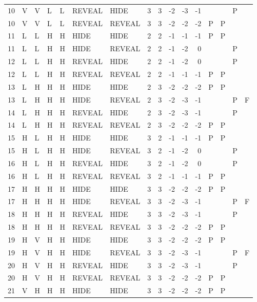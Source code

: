 \begin{longtable}{rllllllrrrrrllll}
  10 & V & V & L & L & REVEAL & HIDE & 3 & 3 & -2 & -3 & -1 &  &  & P &  \\ 
  10 & V & V & L & L & REVEAL & REVEAL & 3 & 3 & -2 & -2 & -2 & P & P &  &  \\ 
  11 & L & L & H & H & HIDE & HIDE & 2 & 2 & -1 & -1 & -1 & P & P &  &  \\ 
  11 & L & L & H & H & HIDE & REVEAL & 2 & 2 & -1 & -2 & 0 &  &  & P &  \\ 
  12 & L & L & H & H & REVEAL & HIDE & 2 & 2 & -1 & -2 & 0 &  &  & P &  \\ 
  12 & L & L & H & H & REVEAL & REVEAL & 2 & 2 & -1 & -1 & -1 & P & P &  &  \\ 
  13 & L & H & H & H & HIDE & HIDE & 2 & 3 & -2 & -2 & -2 & P & P &  &  \\ 
  13 & L & H & H & H & HIDE & REVEAL & 2 & 3 & -2 & -3 & -1 &  &  & P & F \\ 
  14 & L & H & H & H & REVEAL & HIDE & 2 & 3 & -2 & -3 & -1 &  &  & P &  \\ 
  14 & L & H & H & H & REVEAL & REVEAL & 2 & 3 & -2 & -2 & -2 & P & P &  &  \\ 
  15 & H & L & H & H & HIDE & HIDE & 3 & 2 & -1 & -1 & -1 & P & P &  &  \\ 
  15 & H & L & H & H & HIDE & REVEAL & 3 & 2 & -1 & -2 & 0 &  &  & P &  \\ 
  16 & H & L & H & H & REVEAL & HIDE & 3 & 2 & -1 & -2 & 0 &  &  & P &  \\ 
  16 & H & L & H & H & REVEAL & REVEAL & 3 & 2 & -1 & -1 & -1 & P & P &  &  \\ 
  17 & H & H & H & H & HIDE & HIDE & 3 & 3 & -2 & -2 & -2 & P & P &  &  \\ 
  17 & H & H & H & H & HIDE & REVEAL & 3 & 3 & -2 & -3 & -1 &  &  & P & F \\ 
  18 & H & H & H & H & REVEAL & HIDE & 3 & 3 & -2 & -3 & -1 &  &  & P &  \\ 
  18 & H & H & H & H & REVEAL & REVEAL & 3 & 3 & -2 & -2 & -2 & P & P &  &  \\ 
  19 & H & V & H & H & HIDE & HIDE & 3 & 3 & -2 & -2 & -2 & P & P &  &  \\ 
  19 & H & V & H & H & HIDE & REVEAL & 3 & 3 & -2 & -3 & -1 &  &  & P & F \\ 
  20 & H & V & H & H & REVEAL & HIDE & 3 & 3 & -2 & -3 & -1 &  &  & P &  \\ 
  20 & H & V & H & H & REVEAL & REVEAL & 3 & 3 & -2 & -2 & -2 & P & P &  &  \\ 
  21 & V & H & H & H & HIDE & HIDE & 3 & 3 & -2 & -2 & -2 & P & P &  &  \\ 

\end{longtable}
